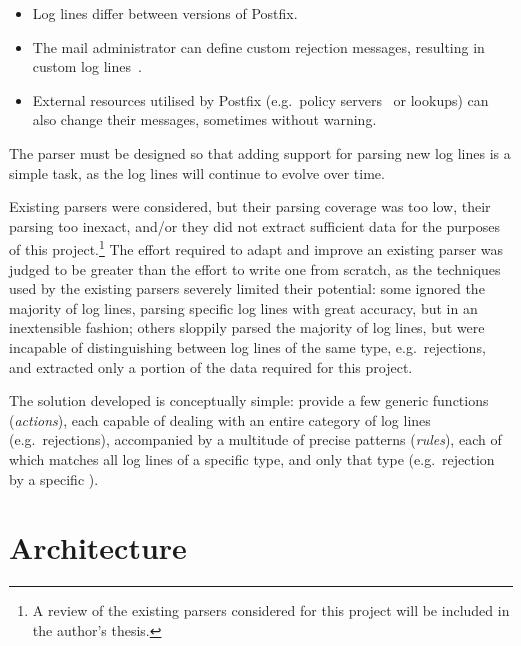 \documentclass[draft]{svmult}
\begin{document}
\begin{itemize}

    \item Log lines differ between versions of Postfix.
        
    \item The mail administrator can define custom rejection messages,
        resulting in custom log lines~\cite{postfix-lookup-tables,
        smtpd_access_readme, smtpd_per_user_control}.

    \item External resources utilised by Postfix (e.g.\ policy
        servers~\cite{policy-servers} or \RBL{} lookups) can also change
        their messages, sometimes without warning.

\end{itemize}

The parser must be designed so that adding support for parsing new log
lines is a simple task, as the log lines will continue to evolve over time.

Existing parsers were considered, but their parsing coverage was too low,
their parsing too inexact, and/or they did not extract sufficient data for
the purposes of this project.\footnote{A review of the existing parsers
considered for this project will be included in the author's thesis.} The
effort required to adapt and improve an existing parser was judged to be
greater than the effort to write one from scratch, as the techniques used
by the existing parsers severely limited their potential: some ignored the
majority of log lines, parsing specific log lines with great accuracy, but
in an inextensible fashion; others sloppily parsed the majority of log
lines, but were incapable of distinguishing between log lines of the same
type, e.g.\ rejections, and extracted only a portion of the data required
for this project.

The solution developed is conceptually simple: provide a few generic
functions (\textit{actions\/}), each capable of dealing with an entire
category of log lines (e.g.\ rejections), accompanied by a multitude of
precise patterns (\textit{rules\/}), each of which matches all log lines of
a specific type, and only that type (e.g.\ rejection by a specific
\RBLshort{}).


\section{Architecture}

\label{Architecture}
\end{document}

